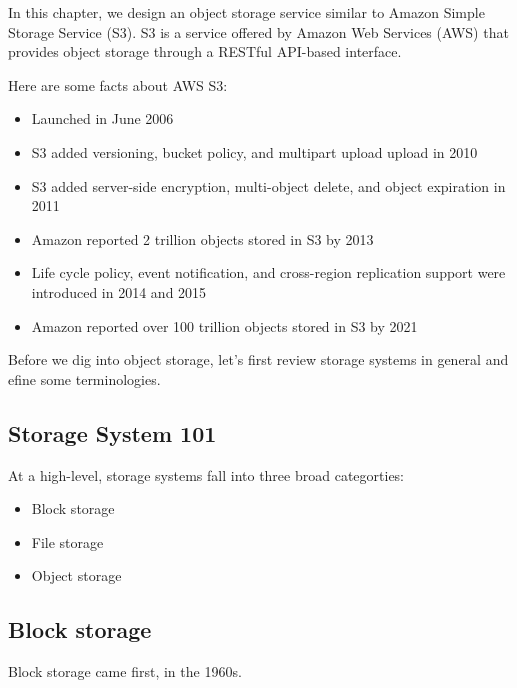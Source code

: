 \documentclass{report}
\theoremstyle{definition}
\let\oldsubsection\subsection
\renewcommand{\subsection}{\oldsubsection*}
\begin{document}
In this chapter, we design an object storage service similar to Amazon Simple Storage Service (S3). S3 is a service offered by Amazon Web Services (AWS) that provides object storage through a RESTful API-based interface.

Here are some facts about AWS S3:

\begin{itemize}
\item
Launched in June 2006
\item
S3 added versioning, bucket policy, and multipart upload upload in 2010
\item
S3 added server-side encryption, multi-object delete, and object expiration in 2011
\item
Amazon reported 2 trillion objects stored in S3 by 2013
\item
Life cycle policy, event notification, and cross-region replication support were introduced in 2014 and 2015
\item
Amazon reported over 100 trillion objects stored in S3 by 2021
\end{itemize}

Before we dig into object storage, let's first review storage systems in general and efine some terminologies.

\subsection{Storage System 101}

At a high-level, storage systems fall into three broad categorties:

\begin{itemize}
\item
Block storage
\item
File storage
\item
Object storage
\end{itemize}

\subsection{Block storage}

Block storage came first, in the 1960s.
\end{document}
